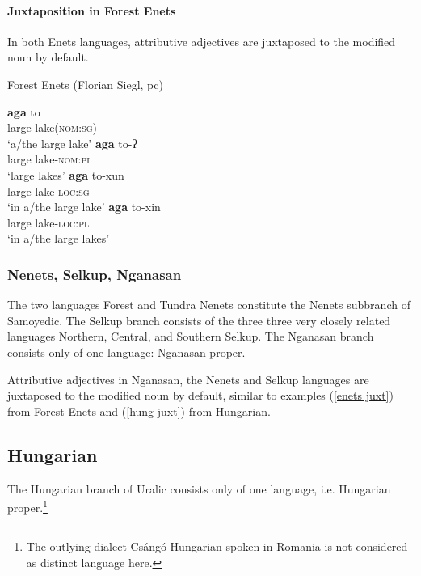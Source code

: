 \paragraph{Juxtaposition in Forest Enets}
In both Enets languages, attributive adjectives are juxtaposed to the modified noun by default.
\begin{exe}
\label{enets juxt}%
\ex \rm{Forest Enets (Florian Siegl, pc)}
\begin{xlist}
\ex 
\gll	\textbf{aga} to\\
	large lake(\textsc{nom:sg})\\
\glt	‘a/the large lake’
\ex 
\gll	\textbf{aga} to-ʔ\\
	large lake\textsc{-nom:pl}\\
\glt	‘large lakes’
\ex 
\gll	\textbf{aga} to-xun\\
	large lake\textsc{-loc:sg}\\
\glt	‘in a/the large lake’
\ex 
\gll	\textbf{aga} to-xin\\
	large lake\textsc{-loc:pl}\\
\glt	‘in a/the large lakes’
\end{xlist}
\end{exe}

\subsubsection{Nenets, Selkup, Nganasan}
The two languages Forest and Tundra Nenets constitute the Nenets subbranch of Samoyedic. The Selkup branch consists of the three three very closely related languages Northern, Central, and Southern Selkup. The Nganasan branch consists only of one language: Nganasan proper.

Attributive adjectives in Nganasan, the Nenets and Selkup languages are juxtaposed to the modified noun by default, similar to examples (\ref{enets juxt}) from Forest Enets and (\ref{hung juxt}) from Hungarian.

\subsection{Hungarian}
The Hungarian branch of Uralic consists only of one language, i.e. Hungarian proper.\footnote{The outlying dialect Csángó Hungarian spoken in Romania is not considered as distinct language here.}

